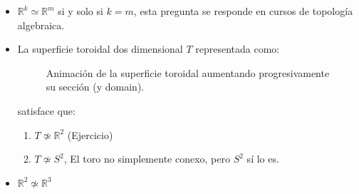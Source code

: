 \begin{itemize}
    \item  $\mathbb R^k \simeq \mathbb R^m$ si y solo si $k=m$, esta pregunta se responde en cursos de topología algebraica. 
    \item La superficie toroidal dos dimensional $T$ representada como:  
\begin{figure}[H]
  \centering
    \caption{Animación de la superficie toroidal aumentando progresivamente su sección (y domain).}
\end{figure}
    satisface que:
    \begin{enumerate}[label=(\alph*)]
        \item $T\not\simeq \mathbb R^2$ \qquad {} (Ejercicio)
        \item $T \not\simeq S^2$, El toro no simplemente conexo, pero $S^2$ sí lo es.
    \end{enumerate}
    \item $\mathbb R^2 \not\simeq \mathbb R^3$

\end{itemize}

